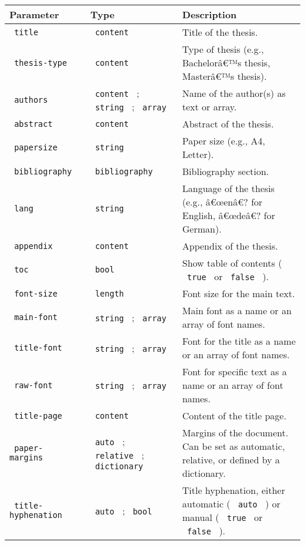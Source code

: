 \begin{longtable}[]{@{}lll@{}}
\toprule\noalign{}
Parameter & Type & Description \\
\midrule\noalign{}
\endhead
\bottomrule\noalign{}
\endlastfoot
\texttt{\ title\ } & \texttt{\ content\ } & Title of the thesis. \\
\texttt{\ thesis-type\ } & \texttt{\ content\ } & Type of thesis (e.g.,
Bachelorâ€™s thesis, Masterâ€™s thesis). \\
\texttt{\ authors\ } & \texttt{\ content\ } ; \texttt{\ string\ } ;
\texttt{\ array\ } & Name of the author(s) as text or array. \\
\texttt{\ abstract\ } & \texttt{\ content\ } & Abstract of the
thesis. \\
\texttt{\ papersize\ } & \texttt{\ string\ } & Paper size (e.g., A4,
Letter). \\
\texttt{\ bibliography\ } & \texttt{\ bibliography\ } & Bibliography
section. \\
\texttt{\ lang\ } & \texttt{\ string\ } & Language of the thesis (e.g.,
â€œenâ€? for English, â€œdeâ€? for German). \\
\texttt{\ appendix\ } & \texttt{\ content\ } & Appendix of the
thesis. \\
\texttt{\ toc\ } & \texttt{\ bool\ } & Show table of contents (
\texttt{\ true\ } or \texttt{\ false\ } ). \\
\texttt{\ font-size\ } & \texttt{\ length\ } & Font size for the main
text. \\
\texttt{\ main-font\ } & \texttt{\ string\ } ; \texttt{\ array\ } & Main
font as a name or an array of font names. \\
\texttt{\ title-font\ } & \texttt{\ string\ } ; \texttt{\ array\ } &
Font for the title as a name or an array of font names. \\
\texttt{\ raw-font\ } & \texttt{\ string\ } ; \texttt{\ array\ } & Font
for specific text as a name or an array of font names. \\
\texttt{\ title-page\ } & \texttt{\ content\ } & Content of the title
page. \\
\texttt{\ paper-margins\ } & \texttt{\ auto\ } ; \texttt{\ relative\ } ;
\texttt{\ dictionary\ } & Margins of the document. Can be set as
automatic, relative, or defined by a dictionary. \\
\texttt{\ title-hyphenation\ } & \texttt{\ auto\ } ; \texttt{\ bool\ } &
Title hyphenation, either automatic ( \texttt{\ auto\ } ) or manual (
\texttt{\ true\ } or \texttt{\ false\ } ). \\
\end{longtable}


